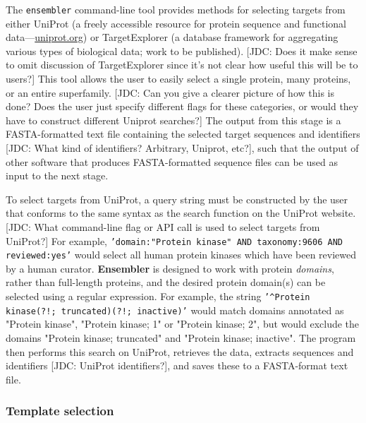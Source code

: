 \documentclass[aps,pre,twocolumn,nofootinbib,superscriptaddress,linenumbers]{revtex4-1}
\begin{document}
The {\tt ensembler} command-line tool provides methods for selecting targets from either UniProt (a freely accessible resource for protein sequence and functional data---\href{http://www.uniprot.org/}{uniprot.org}) or TargetExplorer (a database framework for aggregating various types of biological data; work to be published). 
{\color{red}[JDC: Does it make sense to omit discussion of TargetExplorer since it's not clear how useful this will be to users?]}
This tool allows the user to easily select a single protein, many proteins, or an entire superfamily. 
{\color{red}[JDC: Can you give a clearer picture of how this is done?  Does the user just specify different flags for these categories, or would they have to construct different Uniprot searches?]}
The output from this stage is a FASTA-formatted text file containing the selected target sequences and identifiers {\color{red}[JDC: What kind of identifiers?  Arbitrary, Uniprot, etc?]}, such that the output of other software that produces FASTA-formatted sequence files can be used as input to the next stage. 

To select targets from UniProt, a query string must be constructed by the user that conforms to the same syntax as the search function on the UniProt website. 
{\color{red}[JDC: What command-line flag or API call is used to select targets from UniProt?]}
For example, {\tt'domain:"Protein kinase" AND taxonomy:9606 AND reviewed:yes'} would select all human protein kinases which have been reviewed by a human curator. 
{\bf Ensembler} is designed to work with protein \emph{domains}, rather than full-length proteins, and the desired protein domain(s) can be selected using a regular expression. 
For example, the string {\tt'\^{}Protein kinase(?!; truncated)(?!; inactive)'} would match domains annotated as "Protein kinase", "Protein kinase; 1" or "Protein kinase; 2", but would exclude the domains "Protein kinase; truncated" and "Protein kinase; inactive". 
The program then performs this search on UniProt, retrieves the data, extracts sequences and identifiers {\color{red}[JDC: UniProt identifiers?]}, and saves these to a FASTA-format text file.


\subsubsection{Template selection}
\end{document}
